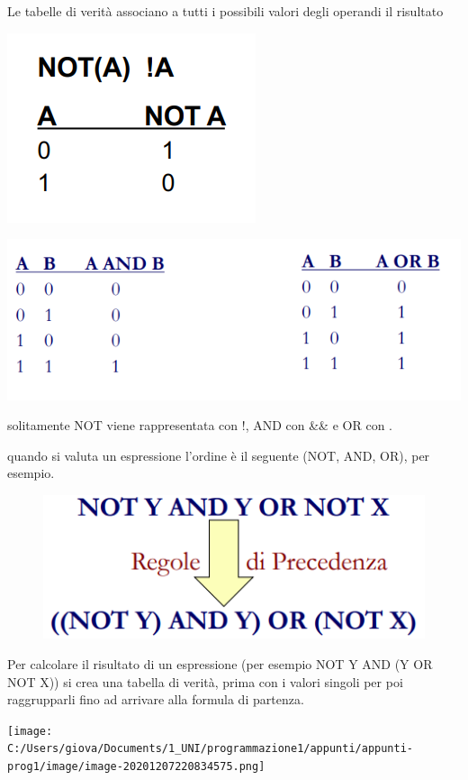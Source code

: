 \documentclass[
  paper=a4,
  oneside  ,captions=tableheading
]{scrbook}
\begin{document}
Le tabelle di verità associano a tutti i possibili valori degli operandi
il risultato

\includegraphics{./image/image-20201207220212631-1607774144622.png}

\includegraphics{./image/image-20201207220252086-1607774220882.png}

solitamente NOT viene rappresentata con !, AND con \&\& e OR con
\textbar\textbar.

quando si valuta un espressione l'ordine è il seguente (NOT, AND, OR),
per esempio.

\begin{figure}
\centering
\includegraphics{./image/image-20201207220627893.png}
\end{figure}

Per calcolare il risultato di un espressione (per esempio NOT Y AND (Y
OR NOT X)) si crea una tabella di verità, prima con i valori singoli per
poi raggrupparli fino ad arrivare alla formula di partenza.

\texttt{[image: C:/Users/giova/Documents/1\_UNI/programmazione1/appunti/appunti-prog1/image/image-20201207220834575.png]}
\end{document}

